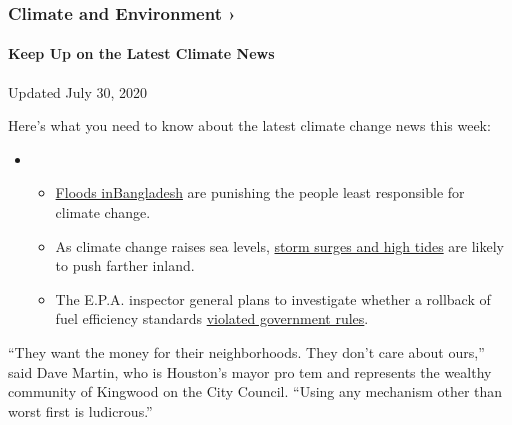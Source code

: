 \href{https://www.nytimes3xbfgragh.onion/section/climate?action=click\&pgtype=Article\&state=default\&region=MAIN_CONTENT_1\&context=storylines_keepup}{}

\hypertarget{climate-and-environment-}{%
\subsubsection{Climate and Environment
›}\label{climate-and-environment-}}

\hypertarget{keep-up-on-the-latest-climate-news}{%
\paragraph{Keep Up on the Latest Climate
News}\label{keep-up-on-the-latest-climate-news}}

Updated July 30, 2020

Here's what you need to know about the latest climate change news this
week:

\begin{itemize}
\item
  \begin{itemize}
  \tightlist
  \item
    \href{https://www.nytimes3xbfgragh.onion/2020/07/30/climate/bangladesh-floods.html?action=click\&pgtype=Article\&state=default\&region=MAIN_CONTENT_1\&context=storylines_keepup}{Floods
    in}\href{https://www.nytimes3xbfgragh.onion/2020/07/30/climate/bangladesh-floods.html?action=click\&pgtype=Article\&state=default\&region=MAIN_CONTENT_1\&context=storylines_keepup}{Bangladesh}
    are punishing the people least responsible for climate change.
  \item
    As climate change raises sea levels,
    \href{https://www.nytimes3xbfgragh.onion/2020/07/30/climate/sea-level-inland-floods.html?action=click\&pgtype=Article\&state=default\&region=MAIN_CONTENT_1\&context=storylines_keepup}{storm
    surges and high tides} are likely to push farther inland.
  \item
    The E.P.A. inspector general plans to investigate whether a rollback
    of fuel efficiency standards
    \href{https://www.nytimes3xbfgragh.onion/2020/07/27/climate/trump-fuel-efficiency-rule.html?action=click\&pgtype=Article\&state=default\&region=MAIN_CONTENT_1\&context=storylines_keepup}{violated
    government rules}.
  \end{itemize}
\end{itemize}

``They want the money for their neighborhoods. They don't care about
ours,'' said Dave Martin, who is Houston's mayor pro tem and represents
the wealthy community of Kingwood on the City Council. ``Using any
mechanism other than worst first is ludicrous.''

